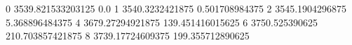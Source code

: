 0 3539.821533203125 0.0
1 3540.3232421875 0.501708984375
2 3545.1904296875 5.368896484375
4 3679.27294921875 139.451416015625
6 3750.525390625 210.703857421875
8 3739.17724609375 199.355712890625
